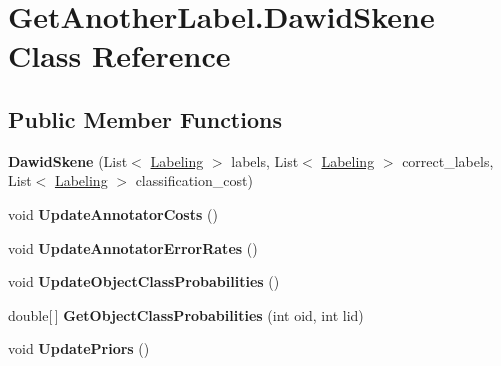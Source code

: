 \hypertarget{class_get_another_label_1_1_dawid_skene}{}\section{Get\+Another\+Label.\+Dawid\+Skene Class Reference}
\label{class_get_another_label_1_1_dawid_skene}
\subsection*{Public Member Functions}
\begin{DoxyCompactItemize}
\item 
\hypertarget{class_get_another_label_1_1_dawid_skene_a1003aff4ae2a4e35e159090f34164f58}{}{\bfseries Dawid\+Skene} (List$<$ \hyperlink{class_get_another_label_1_1_labeling}{Labeling} $>$ labels, List$<$ \hyperlink{class_get_another_label_1_1_labeling}{Labeling} $>$ correct\+\_\+labels, List$<$ \hyperlink{class_get_another_label_1_1_labeling}{Labeling} $>$ classification\+\_\+cost)\label{class_get_another_label_1_1_dawid_skene_a1003aff4ae2a4e35e159090f34164f58}

\item 
\hypertarget{class_get_another_label_1_1_dawid_skene_a931feec181cf2c2d3b8de7083215aba7}{}void {\bfseries Update\+Annotator\+Costs} ()\label{class_get_another_label_1_1_dawid_skene_a931feec181cf2c2d3b8de7083215aba7}

\item 
\hypertarget{class_get_another_label_1_1_dawid_skene_a17ece3815853ceed820bef7324c8ef7a}{}void {\bfseries Update\+Annotator\+Error\+Rates} ()\label{class_get_another_label_1_1_dawid_skene_a17ece3815853ceed820bef7324c8ef7a}

\item 
\hypertarget{class_get_another_label_1_1_dawid_skene_a9245a74a0cd4eed27ef61869610fb93b}{}void {\bfseries Update\+Object\+Class\+Probabilities} ()\label{class_get_another_label_1_1_dawid_skene_a9245a74a0cd4eed27ef61869610fb93b}

\item 
\hypertarget{class_get_another_label_1_1_dawid_skene_a3203d2a611322afd6e542eb3dd16ff3c}{}double\mbox{[}$\,$\mbox{]} {\bfseries Get\+Object\+Class\+Probabilities} (int oid, int lid)\label{class_get_another_label_1_1_dawid_skene_a3203d2a611322afd6e542eb3dd16ff3c}

\item 
\hypertarget{class_get_another_label_1_1_dawid_skene_a9d2f83822c4e863e16adcc39bb8b350e}{}void {\bfseries Update\+Priors} ()\label{class_get_another_label_1_1_dawid_skene_a9d2f83822c4e863e16adcc39bb8b350e}


\end{DoxyCompactItemize}
